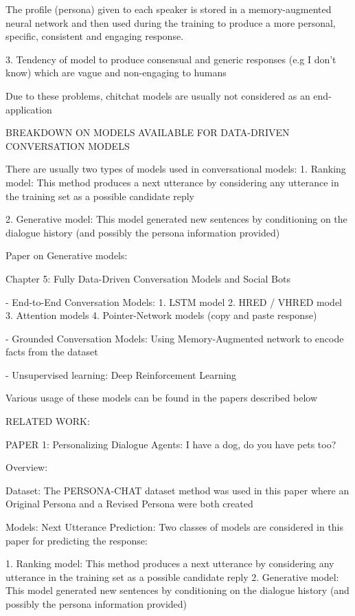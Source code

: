 The profile (persona) given to each speaker is stored in a memory-augmented neural network and then used during the training to produce a more personal, specific, consistent and engaging response. 


3. Tendency of model to produce consensual and generic responses (e.g I don't know) which are vague and non-engaging to humans





Due to these problems, chitchat models are usually not considered as an end-application





BREAKDOWN ON MODELS AVAILABLE FOR DATA-DRIVEN CONVERSATION MODELS

There are usually two types of models used in conversational models:
1. Ranking model: 
	This method produces a next utterance by considering any utterance in the training set as a possible candidate reply

2. Generative model: 
	This model generated new sentences by conditioning on the dialogue history (and possibly the persona information provided)



Paper on Generative models:

Chapter 5: Fully Data-Driven Conversation Models and Social Bots

- End-to-End Conversation Models:
1. LSTM model
2. HRED / VHRED model
3. Attention models
4. Pointer-Network models (copy and paste response)


- Grounded Conversation Models:
	Using Memory-Augmented network to encode facts from the dataset

- Unsupervised learning:
	Deep Reinforcement Learning


Various usage of these models can be found in the papers described below


RELATED WORK:

PAPER 1:
Personalizing Dialogue Agents: I have a dog, do you have pets too?

Overview:

Dataset: 
The PERSONA-CHAT dataset method was used in this paper where an Original Persona and a Revised Persona were both created

Models:
Next Utterance Prediction:
Two classes of models are considered in this paper for predicting the response:

1. Ranking model: This method produces a next utterance by considering any utterance in the training set as a possible candidate reply
2. Generative model: This model generated new sentences by conditioning on the dialogue history (and possibly the persona information provided)

